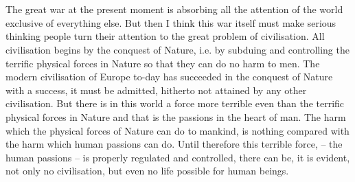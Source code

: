 

\section{}


The great war at the present moment is absorbing all the attention of the world exclusive of everything else.
But then I think this war itself must make serious thinking people turn their attention to the great problem of civilisation.
All civilisation begins by the conquest of Nature, i.e. by subduing and controlling the terrific physical forces in Nature so that they can do no harm to men.
The modern civilisation of Europe to-day has succeeded in the conquest of Nature with a success,
it must be admitted, hitherto not attained by any other civilisation.
But there is in this world a force more terrible even than the terrific physical forces in Nature and that is the passions in the heart of man.
The harm which the physical forces of Nature can do to mankind,
is nothing compared with the harm which human passions can do.
Until therefore this terrible force,
-- the human passions -- is properly regulated and controlled, there can be, it is evident,
not only no civilisation, but even no life possible for human beings.

